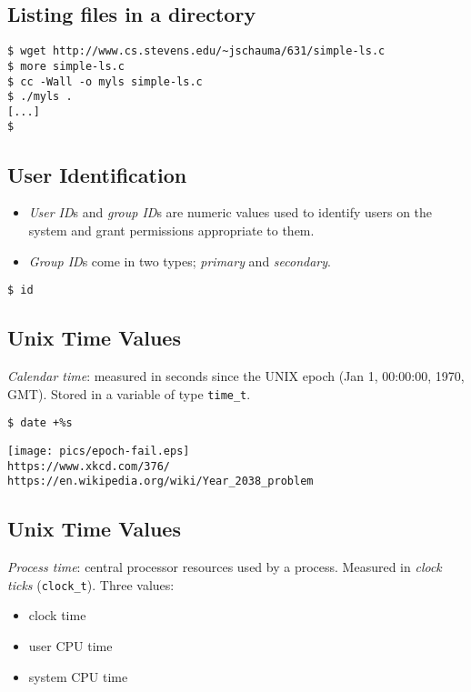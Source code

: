 \documentclass[sxga]{xdvislides}
\begin{document}
\subsection{Listing files in a directory}
\vspace*{\fill}
\begin{verbatim}
$ wget http://www.cs.stevens.edu/~jschauma/631/simple-ls.c
$ more simple-ls.c
$ cc -Wall -o myls simple-ls.c
$ ./myls .
[...]
$
\end{verbatim}
\vspace*{\fill}


\subsection{User Identification}
\begin{itemize}
	\item {\em User ID}s and {\em group ID}s are numeric values used to
		identify users on the system and grant permissions appropriate to them.
	\item {\em Group ID}s come in two types; {\em primary} and {\em secondary}.
\end{itemize}
\vspace{.25in}

\begin{verbatim}
$ id
\end{verbatim}

\subsection{Unix Time Values}
{\em Calendar time}: measured in seconds since the UNIX epoch (Jan
1, 00:00:00, 1970, GMT). Stored in a variable of type {\tt time\_t}.
\\

\begin{verbatim}
$ date +%s
\end{verbatim}

\begin{center}
\texttt{[image: pics/epoch-fail.eps]} \\
\verb+https://www.xkcd.com/376/+ \\
\vspace{.25in}
\verb+https://en.wikipedia.org/wiki/Year_2038_problem+
\end{center}


\subsection{Unix Time Values}
{\em Process time}: central processor resources used by a process.
Measured in {\em clock ticks} ({\tt clock\_t}).  Three values:
\begin{itemize}
	\item clock time
	\item user CPU time
	\item system CPU time
\end{itemize}
\end{document}
